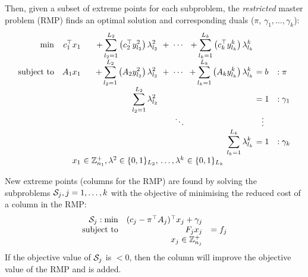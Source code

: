 Then, given a subset of extreme points for each subproblem, the \textit{restricted} master problem (RMP) finds an optimal solution and corresponding duals ($\pi$, $\gamma_1, \ldots, \gamma_k$):
\begin{equation}
\begin{array}{rr@{\ }r@{\ }r@{\ }r@{\ }ll}
             \min & c_1^\top x_1 & + \displaystyle\sum_{l_2=1}^{L_2} \left(c_2^\top y^2_{l_2} \right) \lambda^2_{l_2} & + \ \cdots & + \displaystyle\sum_{l_k=1}^{L_k} \left(c_k^\top y^k_{l_k} \right) \lambda^k_{l_k} \\
\text{subject to} & A_1 x_1      & + \displaystyle\sum_{l_2=1}^{L_2} \left(A_2 y^2_{l_2} \right) \lambda^2_{l_2} & + \ \cdots & + \displaystyle\sum_{l_k=1}^{L_k} \left( A_k y^k_{l_k} \right) \lambda^k_{l_k}      & = b & : \pi \\
                  &              &   \displaystyle\sum_{l_2=1}^{L_2} \lambda^2_{l_2}      &          &                & = 1 & : \gamma_1 \\
                  &              &                &  \ddots  &                & \ \ \vdots \\
                  &              &                &          &   \displaystyle\sum_{l_k=1}^{L_k} \lambda^k_{l_k}      & = 1 & : \gamma_k \\
                  &          x_1 & \in \mathbb{Z}^{+}_{n_1}, \lambda^2 \in \{0, 1\}_{L_2}, & \ldots, \lambda^k & \in \{0, 1\}_{L_k} \hspace{1.25cm} &
\end{array}
\label{eqn:rmp}
\end{equation}

New extreme points (columns for the RMP) are found by solving the subproblems ${\cal S}_j, j = 1, \ldots, k$ with the objective of minimising the reduced cost of a column in the RMP:
\begin{equation}
\begin{array}{rrl}
{\cal S}_j: \min & (c_j - \pi^\top A_j)^\top x_j + \gamma_j \\
\text{subject to} & F_j x_j      & = f_j \\
                  & x_j \in \mathbb{Z}^{+}_{n_j}
\end{array}
\label{eqn:subprob}
\end{equation}
If the objective value of ${\cal S}_j$ is $< 0$, then the column will improve the objective value of the RMP and is added.

